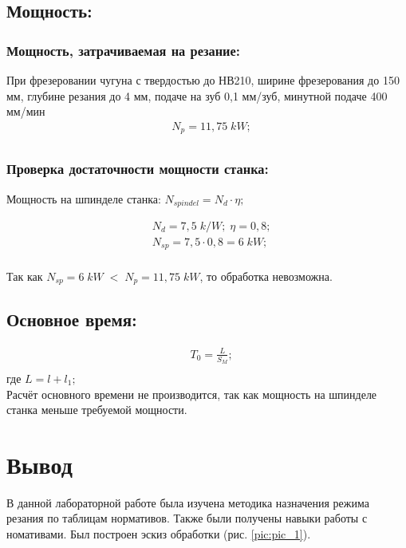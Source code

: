 \subsection{Мощность:}
\subsubsection{Мощность, затрачиваемая на резание:}
При фрезеровании чугуна с твердостью до НВ210, ширине фрезерования до 150 мм, глубине резания до 4 мм, подаче на зуб 0,1 мм/зуб, минутной подаче 400 мм/мин
\begin{equation}
	\begin{split}
		&N_p=11,75\;kW;\\
	\end{split}
\end{equation}

\subsubsection{Проверка достаточности мощности станка:}
Мощность на шпинделе станка: $N_{spindel}=N_d\cdot \eta;$

\begin{equation}
	\begin{split}
		&N_d=7,5\;k/W;\; \eta=0,8;\\
		&N_{sp} = 7,5\cdot 0,8 = 6\;kW;\\
	\end{split}
\end{equation}

Так как $N_{sp}=6 \;kW\; <\; N_p=11,75\;kW$, то обработка невозможна.\\

\subsection{Основное время:}
\begin{equation}
	\begin{split}
		&T_0=\frac{L}{S_M};\\
	\end{split}
\end{equation}
где $L=l+l_1;$\\

Расчёт основного времени не производится, так как мощность на шпинделе станка меньше требуемой мощности.\\

\section{Вывод}
В данной лабораторной работе была изучена методика назначения режима резания по таблицам нормативов. Также были получены навыки работы с номативами. Был построен эскиз обработки (рис. \ref{pic:pic_1}).
